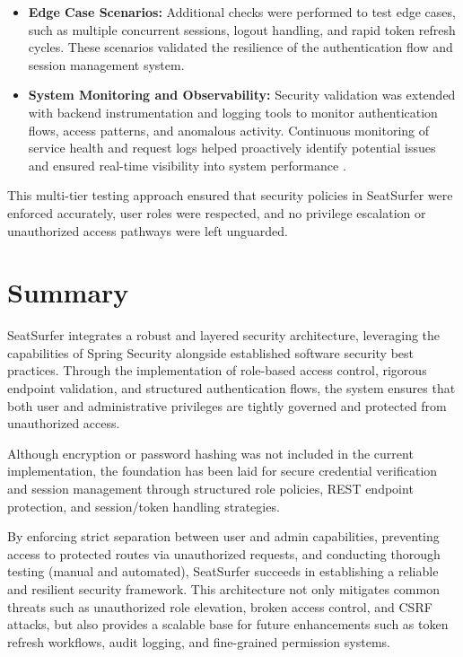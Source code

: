 \documentclass[12pt,a4paper]{report} %
\begin{document}
\begin{itemize}
\item \textbf{Edge Case Scenarios:}  
Additional checks were performed to test edge cases, such as multiple concurrent sessions, logout handling, and rapid token refresh cycles. These scenarios validated the resilience of the authentication flow and session management system.

\item \textbf{System Monitoring and Observability:}  
Security validation was extended with backend instrumentation and logging tools to monitor authentication flows, access patterns, and anomalous activity. Continuous monitoring of service health and request logs helped proactively identify potential issues and ensured real-time visibility into system performance \cite{miller2021microservices}.
\end{itemize}

This multi-tier testing approach ensured that security policies in SeatSurfer were enforced accurately, user roles were respected, and no privilege escalation or unauthorized access pathways were left unguarded.

\section{Summary}

SeatSurfer integrates a robust and layered security architecture, leveraging the capabilities of Spring Security alongside established software security best practices. Through the implementation of role-based access control, rigorous endpoint validation, and structured authentication flows, the system ensures that both user and administrative privileges are tightly governed and protected from unauthorized access.

Although encryption or password hashing was not included in the current implementation, the foundation has been laid for secure credential verification and session management through structured role policies, REST endpoint protection, and session/token handling strategies.

By enforcing strict separation between user and admin capabilities, preventing access to protected routes via unauthorized requests, and conducting thorough testing (manual and automated), SeatSurfer succeeds in establishing a reliable and resilient security framework. This architecture not only mitigates common threats such as unauthorized role elevation, broken access control, and CSRF attacks, but also provides a scalable base for future enhancements such as token refresh workflows, audit logging, and fine-grained permission systems.
\end{document}

